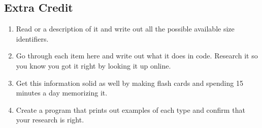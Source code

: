 \subsection{Extra Credit}

\begin{enumerate}
\item Read  or a description of it and write out all the possible
    available size identifiers.
\item Go through each item here and write out what it does in code.  Research it so you
     know you got it right by looking it up online.
\item Get this information solid as well by making flash cards and spending 15 
    minutes a day memorizing it.
\item Create a program that prints out examples of each type and confirm that your
    research is right.
\end{enumerate}


